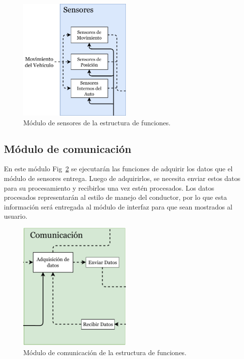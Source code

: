\begin{figure}[htbp!]
\centering
\includegraphics[width=0.5\textwidth]{sens.pdf}
\caption{Módulo de sensores de la estructura de funciones.}
\label{fig:3.5}
\end{figure}

\subsection{Módulo de comunicación}
En este módulo Fig~\ref{fig:3.6} se ejecutarán las funciones de adquirir los datos que el módulo de sensores entrega. Luego de adquirirlos, se necesita enviar estos datos para su procesamiento y recibirlos una vez estén procesados. Los datos procesados representarán al estilo de manejo del conductor, por lo que esta información será entregada al módulo de interfaz para que sean mostrados al usuario.

\begin{figure}[htbp!]
\centering
\includegraphics[width=0.5\textwidth]{com.pdf}
\caption{Módulo de comunicación de la estructura de funciones.}
\label{fig:3.6}
\end{figure}


